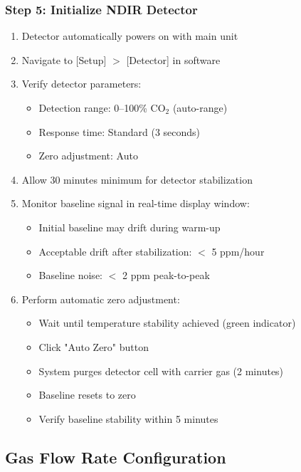 \documentclass[11pt,a4paper]{article}\usepackage[]{graphicx}\usepackage[]{xcolor}
\begin{document}
\subsubsection{Step 5: Initialize NDIR Detector}
\begin{enumerate}[noitemsep]
    \item Detector automatically powers on with main unit
    \item Navigate to [Setup] $>$ [Detector] in software
    \item Verify detector parameters:
    \begin{itemize}
        \item Detection range: 0--100\% CO$_2$ (auto-range)
        \item Response time: Standard (3 seconds)
        \item Zero adjustment: Auto
    \end{itemize}
    \item Allow 30 minutes minimum for detector stabilization
    \item Monitor baseline signal in real-time display window:
    \begin{itemize}
        \item Initial baseline may drift during warm-up
        \item Acceptable drift after stabilization: $<$ 5 ppm/hour
        \item Baseline noise: $<$ 2 ppm peak-to-peak
    \end{itemize}
    \item Perform automatic zero adjustment:
    \begin{itemize}
        \item Wait until temperature stability achieved (green indicator)
        \item Click "Auto Zero" button
        \item System purges detector cell with carrier gas (2 minutes)
        \item Baseline resets to zero
        \item Verify baseline stability within 5 minutes
    \end{itemize}
\end{enumerate}

\subsection{Gas Flow Rate Configuration}
\end{document}
